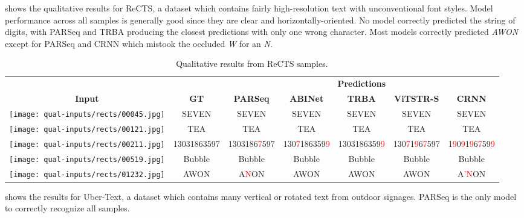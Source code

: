  shows the qualitative results for ReCTS, a dataset which contains fairly high-resolution text with unconventional font styles. Model performance across all samples is generally good since they are clear and horizontally-oriented. No model correctly predicted the string of digits, with PARSeq and TRBA producing the closest predictions with only one wrong character. Most models correctly predicted \textit{AWON} except for PARSeq and CRNN which mistook the occluded \textit{W} for an \textit{N}.

\begin{table*}[htb]
  \centering
  \scriptsize
  \setlength\tabcolsep{2pt}
  \caption{Qualitative results from ReCTS samples.}
  \begin{tabular}{ c c c c c c c }
    \toprule
    & & \multicolumn{5}{c}{\textbf{Predictions}} \\
    \cmidrule{3-7}
    \textbf{Input} & \textbf{GT} & \textbf{PARSeq} & \textbf{ABINet} & \textbf{TRBA} & \textbf{ViTSTR-S} & \textbf{CRNN} \\
    \midrule
    \texttt{[image: qual-inputs/rects/00045.jpg]} & SEVEN & SEVEN & SEVEN & SEVEN & SEVEN & SEVEN \\
    \texttt{[image: qual-inputs/rects/00121.jpg]} & TEA & TEA & TEA & TEA & TEA & TEA \\
    \texttt{[image: qual-inputs/rects/00211.jpg]} & {\scriptsize 13031863597} & {\scriptsize 1303186\textcolor{red}{7}597} & {\scriptsize 130\textcolor{red}{7}186359\textcolor{red}{9}} & {\scriptsize 1303186359\textcolor{red}{9}} & {\scriptsize 130\textcolor{red}{7}1\textcolor{red}{9}6\textcolor{red}{7}597} & {\scriptsize 1\textcolor{red}{9}0\textcolor{red}{9}1\textcolor{red}{9}6\textcolor{red}{7}59\textcolor{red}{9}} \\
    \texttt{[image: qual-inputs/rects/00519.jpg]} & Bubble & Bubble & Bubble & Bubble & Bubble & Bubble \\
    \texttt{[image: qual-inputs/rects/01232.jpg]} & AWON & A\textcolor{red}{N}ON & AWON & AWON & AWON & A\textcolor{red}{'N}ON \\
    \bottomrule
  \end{tabular}
  \label{tab:qual-results-rects}
\end{table*}

 shows the results for Uber-Text, a dataset which contains many vertical or rotated text from outdoor signages. PARSeq is the only model to correctly recognize all samples.



